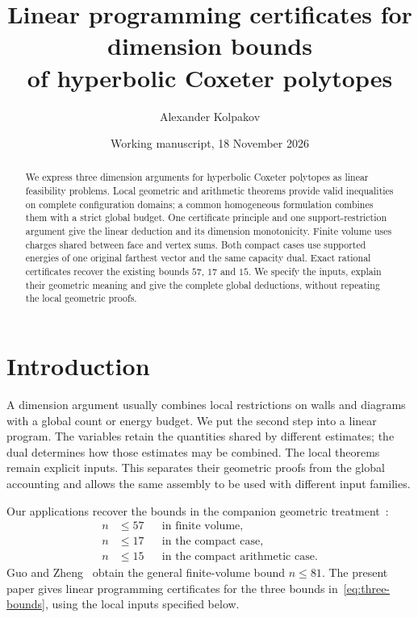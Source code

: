 \documentclass[11pt]{article}
\title{Linear programming certificates for dimension bounds\\
of hyperbolic Coxeter polytopes}
\author{Alexander Kolpakov}
\date{Working manuscript, 18 November 2026}
\theoremstyle{definition}
\theoremstyle{remark}
\numberwithin{equation}{section}
\begin{document}
\maketitle

\begin{abstract}
We express three dimension arguments for hyperbolic Coxeter polytopes
as linear feasibility problems. Local geometric and arithmetic
theorems provide valid inequalities on complete configuration domains;
a common homogeneous formulation combines them with a strict global
budget. One certificate principle and one support-restriction argument
give the linear deduction and its dimension monotonicity. Finite
volume uses charges shared between face and vertex sums. Both compact
cases use supported energies of one original farthest vector and the
same capacity dual. Exact rational certificates recover the existing
bounds $57$, $17$ and $15$. We specify the inputs, explain their
geometric meaning and give the complete global deductions, without
repeating the local geometric proofs.
\end{abstract}

\tableofcontents

\section{Introduction}
\label{sec:introduction}

A dimension argument usually combines local restrictions on walls
and diagrams with a global count or energy budget. We put the second
step into a linear program. The variables retain the quantities
shared by different estimates; the dual determines how those
estimates may be combined. The local theorems remain explicit inputs.
This separates their geometric proofs from the global accounting and
allows the same assembly to be used with different input families.

Our applications recover the bounds in the companion geometric
treatment~\cite{BoundsArticle,BoundsSupplement}:
\begin{equation}\label{eq:three-bounds}
 \begin{aligned}
 n&\le57&&\text{in finite volume},\\
 n&\le17&&\text{in the compact case},\\
 n&\le15&&\text{in the compact arithmetic case}.
 \end{aligned}
\end{equation}
Guo and Zheng~\cite{GuoZheng2026} obtain the general finite-volume
bound $n\le81$. The present paper gives linear programming
certificates for the three bounds in~\eqref{eq:three-bounds}, using
the local inputs specified below.
\end{document}
